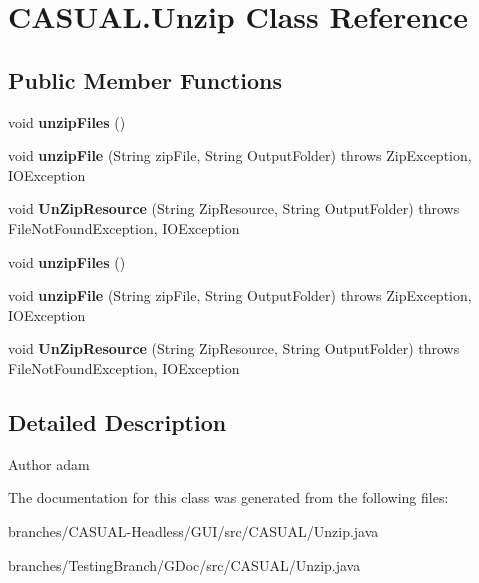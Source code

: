 \hypertarget{classCASUAL_1_1Unzip}{\section{C\-A\-S\-U\-A\-L.\-Unzip Class Reference}
\label{classCASUAL_1_1Unzip}
}
\subsection*{Public Member Functions}
\begin{DoxyCompactItemize}
\item 
\hypertarget{classCASUAL_1_1Unzip_a663c2348804e17be43f339e596f76b22}{void {\bfseries unzip\-Files} ()}\label{classCASUAL_1_1Unzip_a663c2348804e17be43f339e596f76b22}

\item 
\hypertarget{classCASUAL_1_1Unzip_a7f8c9c77edbb7b07afec4c6a8d6f2060}{void {\bfseries unzip\-File} (String zip\-File, String Output\-Folder)  throws Zip\-Exception, I\-O\-Exception }\label{classCASUAL_1_1Unzip_a7f8c9c77edbb7b07afec4c6a8d6f2060}

\item 
\hypertarget{classCASUAL_1_1Unzip_ae5d9c021b1d4b4a27b408b3bbd1a44e6}{void {\bfseries Un\-Zip\-Resource} (String Zip\-Resource, String Output\-Folder)  throws File\-Not\-Found\-Exception, I\-O\-Exception }\label{classCASUAL_1_1Unzip_ae5d9c021b1d4b4a27b408b3bbd1a44e6}

\item 
\hypertarget{classCASUAL_1_1Unzip_a663c2348804e17be43f339e596f76b22}{void {\bfseries unzip\-Files} ()}\label{classCASUAL_1_1Unzip_a663c2348804e17be43f339e596f76b22}

\item 
\hypertarget{classCASUAL_1_1Unzip_a7f8c9c77edbb7b07afec4c6a8d6f2060}{void {\bfseries unzip\-File} (String zip\-File, String Output\-Folder)  throws Zip\-Exception, I\-O\-Exception }\label{classCASUAL_1_1Unzip_a7f8c9c77edbb7b07afec4c6a8d6f2060}

\item 
\hypertarget{classCASUAL_1_1Unzip_ae5d9c021b1d4b4a27b408b3bbd1a44e6}{void {\bfseries Un\-Zip\-Resource} (String Zip\-Resource, String Output\-Folder)  throws File\-Not\-Found\-Exception, I\-O\-Exception }\label{classCASUAL_1_1Unzip_ae5d9c021b1d4b4a27b408b3bbd1a44e6}

\end{DoxyCompactItemize}


\subsection{Detailed Description}
\begin{DoxyAuthor}{Author}
adam 
\end{DoxyAuthor}


The documentation for this class was generated from the following files\-:\begin{DoxyCompactItemize}
\item 
branches/\-C\-A\-S\-U\-A\-L-\/\-Headless/\-G\-U\-I/src/\-C\-A\-S\-U\-A\-L/Unzip.\-java\item 
branches/\-Testing\-Branch/\-G\-Doc/src/\-C\-A\-S\-U\-A\-L/Unzip.\-java\end{DoxyCompactItemize}
